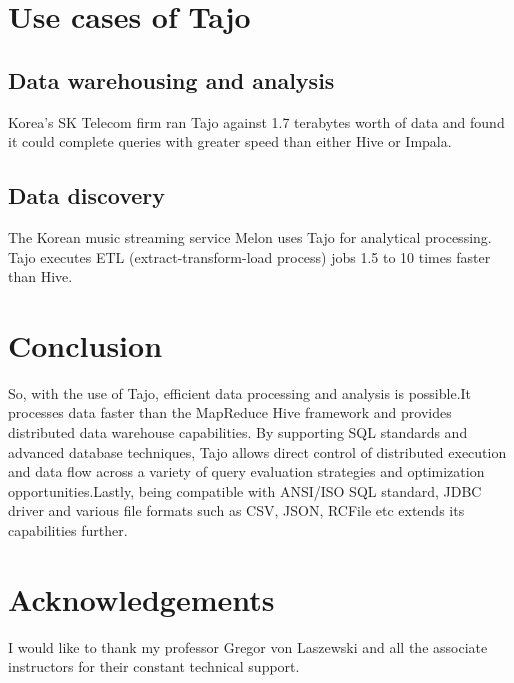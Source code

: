 \documentclass[9pt,twocolumn,twoside]{styles/osajnl}
\begin{document}
\section{Use cases of Tajo}
\subsection{Data warehousing and analysis}
Korea's SK Telecom firm \cite{www-apache-tajo-tutorialspoint} ran Tajo against 1.7 terabytes worth of data and found
it could complete queries with greater speed than either Hive or
Impala.

\subsection{Data discovery}
The Korean music streaming \cite{www-apache-tajo-tutorialspoint}
service Melon uses Tajo for analytical processing. Tajo executes ETL
(extract-transform-load process) jobs 1.5 to 10 times faster than
Hive.

\section{Conclusion}
So, with the use of \cite{www-apache-tajo} Tajo, efficient data
processing and analysis is possible.It processes data faster than the
MapReduce Hive framework and provides distributed data warehouse
capabilities. By supporting SQL standards and advanced database
techniques, Tajo allows direct control of distributed execution and
data flow across a variety of query evaluation strategies and
optimization opportunities.Lastly, being compatible with ANSI/ISO SQL
standard, JDBC driver and various file formats such as CSV, JSON,
RCFile etc extends its capabilities further.

\section*{Acknowledgements}

I would like to thank my professor Gregor von Laszewski and all the
associate instructors for their constant technical support.



 


\newpage

\appendix
\end{document}
